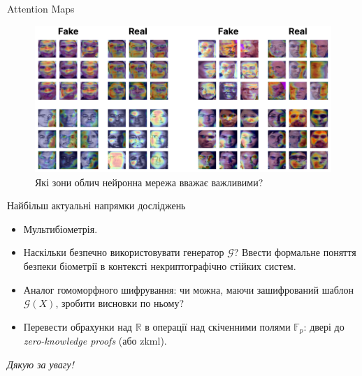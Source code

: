 \documentclass[xcolor={usenames,dvipsnames}]{beamer}
\begin{document}
    \begin{frame}{Attention Maps}
        \begin{figure}
        \centering
            \includegraphics[width=\textwidth]{images/maps.png}
            \caption{Які зони облич нейронна мережа вважає важливими?}
        \end{figure}
    \end{frame}

    \begin{frame}{Найбільш актуальні напрямки досліджень}
        \begin{itemize}
            \item Мультибіометрія.
            \item Наскільки безпечно використовувати генератор $\mathcal{G}$? Ввести формальне поняття безпеки біометрії в контексті некриптографічно стійких систем.
            \item Аналог гомоморфного шифрування: чи можна, маючи зашифрований шаблон $\mathcal{G}(X)$, зробити висновки по ньому?
            \item Перевести обрахунки над $\mathbb{R}$ в операції над скіченними полями $\mathbb{F}_p$: двері до \textit{zero-knowledge proofs} (або zkml).
        \end{itemize}
    \end{frame}
    
	\begin{frame}{}
      \centering \Large
      \emph{Дякую за увагу!}
    \end{frame}
\end{document}
